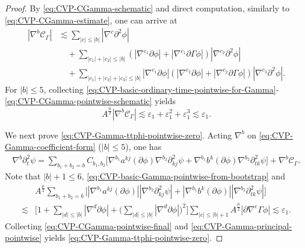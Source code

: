 \documentclass[11pt,twoside]{article}
\def\p{\partial}
\def\ve{\varepsilon}
\def\ls{\lesssim}
\theoremstyle{plain}
\theoremstyle{definition}
\theoremstyle{assumption}
\numberwithin{equation}{section}
\begin{document}
\begin{proof}
		By \eqref{eq:CVP-CGamma-schematic} and direct computation, similarly to \eqref{eq:CVP-CGamma-estimate}, one can arrive at
			\begin{equation}
			\label{eq:CVP-CGamma-pointwise-schematic}
			\begin{aligned}
				|\nabla^b\mathcal C_\Gamma|
				&\ls
				\sum_{|c|\le |b|}
				|\nabla^c\p^2\phi|
				\\
				&\quad+
				\sum_{|c_1|+|c_2|\le |b|}
				\left(
				|\nabla^{c_1}\p\phi|
				+
				|\nabla^{c_1}\p\Gamma\phi|
				\right)
				|\nabla^{c_2}\p^2\phi|
				\\
				&\quad+
				\sum_{|c_1|+|c_2|+|c_3|\le |b|}
				|\nabla^{c_1}\p\phi|
				\left(
				|\nabla^{c_2}\p\phi|
				+
				|\nabla^{c_2}\p\Gamma\phi|
				\right)
				|\nabla^{c_3}\p^2\phi|.
			\end{aligned}
		\end{equation}
		For \(|b|\le 5\), collecting
		\eqref{eq:CVP-basic-ordinary-time-pointwise-for-Gamma}-\eqref{eq:CVP-CGamma-pointwise-schematic}
		yields
		\begin{equation}
			\label{eq:CVP-CGamma-pointwise-final}
			A^{\frac{\mu}{2}}
			|\nabla^b\mathcal C_\Gamma|
			\ls
			\ve_1+\ve_1^2+\ve_1^3
			\ls
			\ve_1.
		\end{equation}
		
		We next prove \eqref{eq:CVP-Gamma-ttphi-pointwise-zero}. Acting
		\(\nabla^b\) on \eqref{eq:CVP-Gamma-coefficient-form} (\(|b|\le 5\)), one has
		\begin{equation}
			\label{eq:CVP-Gamma-ttphi-Leibniz}
			\begin{aligned}
				\nabla^b\p_t^2\psi
				=\sum_{b_1+b_2=b}
				C_{b_1,b_2}
				\big[
				\nabla^{b_1}a^{kj}(\p\phi)
				\nabla^{b_2}\p_{kj}^2\psi
				+
				\nabla^{b_1}b^k(\p\phi)
				\nabla^{b_2}\p_{tk}^2\psi
				\big]
				+\nabla^b\mathcal C_\Gamma.
			\end{aligned}
		\end{equation}
	Note that \(|b|+1\le 6\), \eqref{eq:CVP-basic-Gamma-pointwise-from-bootstrap} and
		\begin{equation}
			\label{eq:CVP-Gamma-principal-pointwise}
			\begin{aligned}
				&A^{\frac{\mu}{2}}\sum_{b_1+b_2=b}
				\big[
				|\nabla^{b_1}a^{kj}(\p\phi)|
				|\nabla^{b_2}\p_{kj}^2\psi|
				+
				|\nabla^{b_1}b^k(\p\phi)|
				|\nabla^{b_2}\p_{tk}^2\psi|
				\big]
				\\
				\ls&
				\big[
				1+\sum_{|d|\le |b|}|\nabla^d\p\phi|+\Big(\sum_{|d|\le |b|}|\nabla^d\p\phi|\Big)^2
				\big]
				\sum_{|c|\le |b|+1}	A^{\frac{\mu}{2}}
				|\p\nabla^c\Gamma\phi|
				\ls
				\ve_1.
			\end{aligned}
		\end{equation}
	Collecting 	\eqref{eq:CVP-CGamma-pointwise-final} and \eqref{eq:CVP-Gamma-principal-pointwise}
		yields  \eqref{eq:CVP-Gamma-ttphi-pointwise-zero}.
		

\end{proof}
\end{document}
